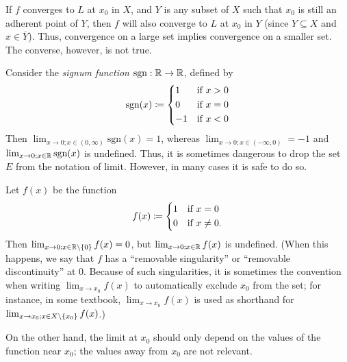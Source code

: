 \begin{note}
  If \(f\) converges to \(L\) at \(x_0\) in \(X\), and \(Y\) is any subset of \(X\) such that \(x_0\) is still an adherent point of \(Y\), then \(f\) will also converge to \(L\) at \(x_0\) in \(Y\)
  (since \(Y \subseteq X\) and \(x \in \overline{Y}\)).
  Thus, convergence on a large set implies convergence on a smaller set.
  The converse, however, is not true.
\end{note}

\begin{eg}\label{i:9.3.16}
  Consider the \emph{signum function} \(\text{sgn} : \mathbb{R} \to \mathbb{R}\), defined by
  \[
    \text{sgn}(x) \coloneqq \begin{dcases}
      1  & \text{if } x > 0 \\
      0  & \text{if } x = 0 \\
      -1 & \text{if } x < 0
    \end{dcases}
  \]
  Then \(\lim_{x \to 0 ; x \in (0, \infty)} \text{sgn}(x) = 1\), whereas \(\lim_{x \to 0 ; x \in (-\infty, 0)} = -1\) and \(\lim_{x \to 0 ; x \in \mathbb{R}} \text{sgn}(x)\) is undefined.
  Thus, it is sometimes dangerous to drop the set \(E\) from the notation of limit.
  However, in many cases it is safe to do so.
\end{eg}

\begin{eg}\label{i:9.3.17}
  Let \(f(x)\) be the function
  \[
    f(x) \coloneqq \begin{dcases}
      1 & \text{if } x = 0     \\
      0 & \text{if } x \neq 0.
    \end{dcases}
  \]
  Then \(\lim_{x \to 0 ; x \in \mathbb{R} \setminus \left\lbrace0\right\rbrace} f(x) = 0\), but \(\lim_{x \to 0 ; x \in \mathbb{R}} f(x)\) is undefined.
  (When this happens, we say that \(f\) has a ``removable singularity'' or ``removable discontinuity'' at \(0\).
  Because of such singularities, it is sometimes the convention when writing \(\lim_{x \to x_0} f(x)\) to automatically exclude \(x_0\) from the set;
  for instance, in some textbook, \(\lim_{x \to x_0} f(x)\) is used as shorthand for \(\lim_{x \to x_0 ; x \in X \setminus \left\lbrace x_0\right\rbrace} f(x)\).)
\end{eg}

\begin{note}
  On the other hand, the limit at \(x_0\) should only depend on the values of the function near \(x_0\);
  the values away from \(x_0\) are not relevant.
\end{note}

